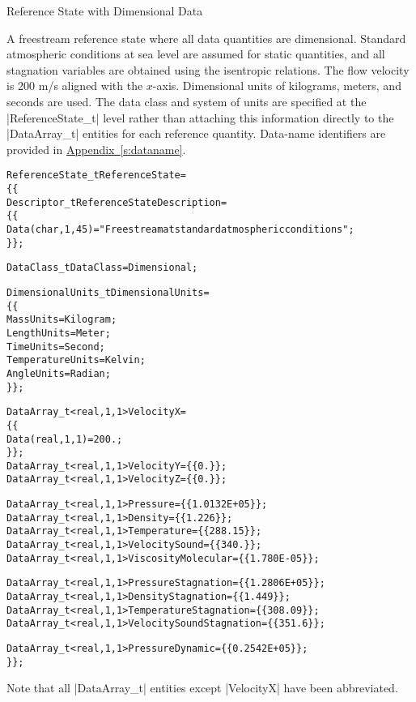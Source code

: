 \begin{example}{Reference State with Dimensional Data}

A freestream reference state where all data quantities are dimensional.
Standard atmospheric conditions at sea level are assumed for static
quantities, and all stagnation variables are obtained using the
isentropic relations.
The flow velocity is 200 m/s aligned with the $x$-axis.
Dimensional units of kilograms, meters, and seconds are used.
The data class and system of units are specified at the
|ReferenceState_t| level rather than attaching this information directly
to the |DataArray_t| entities for each reference quantity.
Data-name identifiers are provided in
\hyperref[s:dataname]{Appendix~\ref*{s:dataname}}.
\begin{alltt}
  ReferenceState\_t ReferenceState = 
    \{\{
    Descriptor\_t ReferenceStateDescription = 
      \{\{
      Data(char, 1, 45) = "Freestream at standard atmospheric conditions" ;
      \}\} ;
    
    DataClass\_t DataClass = Dimensional ;

    DimensionalUnits\_t DimensionalUnits =
      \{\{
      MassUnits        = Kilogram ;
      LengthUnits      = Meter ;
      TimeUnits        = Second ;
      TemperatureUnits = Kelvin ;
      AngleUnits       = Radian ;
      \}\} ;

    DataArray\_t<real, 1, 1> VelocityX = 
      \{\{
      Data(real, 1, 1) = 200. ;
      \}\} ;
    DataArray\_t<real, 1, 1> VelocityY               = \{\{ 0. \}\} ;
    DataArray\_t<real, 1, 1> VelocityZ               = \{\{ 0. \}\} ;

    DataArray\_t<real, 1, 1> Pressure                = \{\{ 1.0132E+05 \}\} ;
    DataArray\_t<real, 1, 1> Density                 = \{\{ 1.226 \}\} ;
    DataArray\_t<real, 1, 1> Temperature             = \{\{ 288.15 \}\} ;
    DataArray\_t<real, 1, 1> VelocitySound           = \{\{ 340. \}\} ;
    DataArray\_t<real, 1, 1> ViscosityMolecular      = \{\{ 1.780E-05 \}\} ;

    DataArray\_t<real, 1, 1> PressureStagnation      = \{\{ 1.2806E+05 \}\} ;
    DataArray\_t<real, 1, 1> DensityStagnation       = \{\{ 1.449 \}\} ;
    DataArray\_t<real, 1, 1> TemperatureStagnation   = \{\{ 308.09 \}\} ;
    DataArray\_t<real, 1, 1> VelocitySoundStagnation = \{\{ 351.6 \}\} ;

    DataArray\_t<real, 1, 1> PressureDynamic         = \{\{ 0.2542E+05 \}\} ;
    \}\} ;                        
\end{alltt}
Note that all |DataArray_t| entities except |VelocityX| have been
abbreviated.
\end{example}

